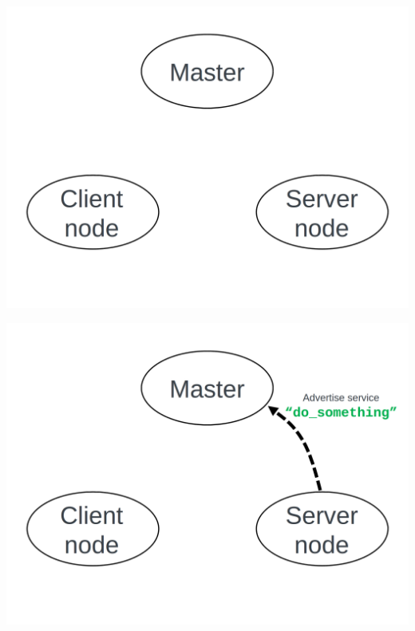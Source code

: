 \documentclass{beamer}
\begin{document}
\begin{frame}[plain]{}
 \centering
 \includegraphics[width =1.0\linewidth]{figures/service1.png}                                                              
\end{frame} 
\begin{frame}[plain]{}
    \centering
    \includegraphics[width =1.0\linewidth]{figures/service2.png}                                                              
\end{frame} 
\end{document}
